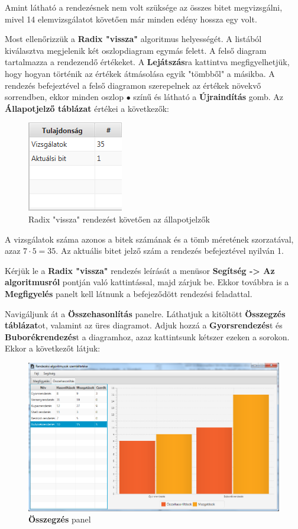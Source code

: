 \documentclass{elteikthesis}
\begin{document}
Amint látható a rendezésnek nem volt szüksége az összes bitet megvizsgálni, mivel 14 elemvizsgálatot követően már minden edény hossza egy volt. 
\par
Most ellenőrizzük a \textbf{Radix "vissza"} algoritmus helyességét. A listából kiválasztva megjelenik két oszlopdiagram egymás felett. A felső diagram tartalmazza a rendezendő értékeket. A \textbf{Lejátszás}ra kattintva megfigyelhetjük, hogy hogyan történik az értékek átmásolása egyik "tömbből" a másikba. A rendezés befejeztével a felső diagramon szerepelnek az értékek növekvő sorrendben, ekkor minden oszlop \textcolor{done}{\Huge$\bullet$} színű és látható a \textbf{Újraindítás} gomb. Az \textbf{Állapotjelző táblázat} értékei a következők:
\begin{figure}[H]
	\centering
	\includegraphics{pics/test/radixbackwardcounters.png}
	\caption{Radix "vissza" rendezést követően az állapotjelzők}
\end{figure}
A vizsgálatok száma azonos a bitek számának és a tömb méretének szorzatával, azaz $7\cdot 5 = 35$. Az aktuális bitet jelző szám a rendezés befejeztével nyilván 1.\par
Kérjük le a \textbf{Radix "vissza"} rendezés leírását a menüsor \textbf{Segítség -> Az algoritmusról} pontján való kattintással, majd zárjuk be. Ekkor továbbra is a \textbf{Megfigyelés} panelt kell látnunk a befejeződött rendezési feladattal.\par
Navigáljunk át a \textbf{Összehasonlítás} panelre. Láthatjuk a kitöltött \textbf{Összegzés táblázat}ot, valamint az üres diagramot. Adjuk hozzá a \textbf{Gyorsrendezés}t és \textbf{Buborékrendezés}t a diagramhoz, azaz kattintsunk kétszer ezeken a sorokon. Ekkor a következőt látjuk:
\begin{figure}[H]
	\centering
	\includegraphics[width=\textwidth]{pics/test/benchmark.png}
	\caption{\textbf{Összegzés} panel}
\end{figure}
\end{document}
